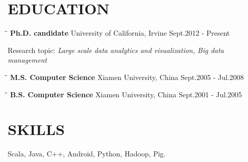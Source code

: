 \documentclass{res}
\begin{document}
\begin{resume}
\section{EDUCATION}
   \vspace{-0.1in}
   \begin{tabbing}
  \hspace{2in}\= \hspace{3in}\= \kill %
    {\bf Ph.D. candidate} \>  University of California, Irvine    \>Sept.2012 - Present\\
   \end{tabbing}\vspace{-30pt}      %
   Research topic:\emph{ Large scale data analytics and visualization, Big data management}
   \vspace{-0.1in}
   \begin{tabbing}
   \hspace{2in}\= \hspace{3in}\= \kill %
    {\bf M.S. Computer Science} \>Xiamen University, China     \>Sept.2005 - Jul.2008\\
   \end{tabbing}\vspace{-30pt}      %
   \vspace{-0.1in}
   \begin{tabbing}
   \hspace{2in}\= \hspace{3in}\= \kill %
    {\bf B.S. Computer Science} \>Xiamen University, China     \>Sept.2001 - Jul.2005\\
   \end{tabbing}\vspace{-30pt}      %

\section{SKILLS}
    Scala, Java, C++, Android, Python, Hadoop, Pig.


\end{resume}
\end{document}
